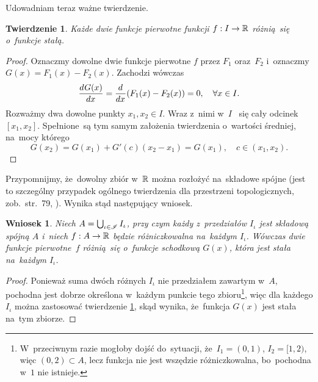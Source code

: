 \documentclass[a4paper,11pt]{article}
\newtheorem{twr}{Twierdzenie}  %
\newtheorem{wni}{Wniosek}
\begin{document}
Udowadniam teraz ważne twierdzenie.
\begin{twr}
  \label{thm:FichtenholzVolII-01}
  Każde dwie funkcje pierwotne funkcji $f: I \to \mathbb{R}$ różnią~się
  o~funkcje stałą.
\end{twr}
\begin{proof}
  Oznaczmy dowolne dwie funkcje pierwotne $f$ przez $F_{ 1 }$
  oraz~$F_{ 2 }$ i~oznaczmy $G( x ) = F_{ 1 }( x ) - F_{ 2 }( x )$.
  Zachodzi wówczas
  \begin{equation}
    \label{eq:FichtenholzVolII-06}
    \frac{ d^{   } {  G( x )  } }{ d {  x  }^{   } } = \frac{ d^{   } {   } }{ d {  x  }^{   } } ( F_{ 1 }( x ) - F_{ 2 }( x ) )
    = 0,
    \quad \forall x \in I.
  \end{equation}
  Rozważmy dwa dowolne punkty $x_{ 1 }, x_{ 2 } \in I$. Wraz z~nimi
  w~$I$ ~się cały odcinek $[ x_{ 1 }, x_{ 2 } ]$. Spełnione~są tym
  samym założenia twierdzenia o~wartości średniej, na~mocy którego
  \begin{equation}
    \label{eq:FichtenholzVolII-07}
    G( x_{ 2 } ) = G( x_{ 1 } ) + G'( c ) ( x_{ 2 } - x_{ 1 } ) = G( x_{ 1 } ),
    \quad c \in ( x_{ 1 }, x_{ 2 } ).
  \end{equation}
\end{proof}
Przypomnijmy, że~dowolny zbiór w~$\mathbb{R}$ można rozłożyć na~składowe
spójne (jest to szczególny przypadek ogólnego twierdzenia dla
przestrzeni topologicznych, zob.~str.~79,
\cite{SchwartzKursAnalizyMatematycznejTomI1979}). Wynika stąd
następujący wniosek.
\begin{wni}
  \label{cor:FichtenholzVolII-01}
  Niech $A = \bigcup_{ \iota \in \mathcal{I} } I_{ \iota }$, przy czym
  każdy z~przedziałów $I_{ \iota }$ jest składową spójną $A$ i~niech
  $f: A \to \mathbb{R}$ będzie różniczkowalna na~każdym $I_{ \iota }$. Wówczas
  dwie funkcje pierwotne~$f$ różnią~się o~funkcje schodkową $G( x )$,
  która jest stała na~każdym $I_{ \iota }$.
\end{wni}
\begin{proof}
  Ponieważ suma dwóch różnych $I_{ \iota }$ nie przedziałem zawartym
  w~$A$, pochodna jest dobrze określona w~każdym punkcie tego
  zbioru\footnote{W~przeciwnym razie mogłoby dojść do~sytuacji,
    że~$I_{ 1 } = (0, 1)$, $I_{ 2 } = [ 1, 2 )$, więc
    $( 0, 2 ) \subset A$, lecz funkcja nie jest wszędzie
    różniczkowalna, bo~pochodna w~$1$ nie istnieje.}, więc dla każdego
  $I_{ \iota }$ można zastosować twierdzenie
  \ref{thm:FichtenholzVolII-01}, skąd wynika, że~funkcja $G( x )$ jest
  stała na~tym zbiorze.
\end{proof}
\end{document}
